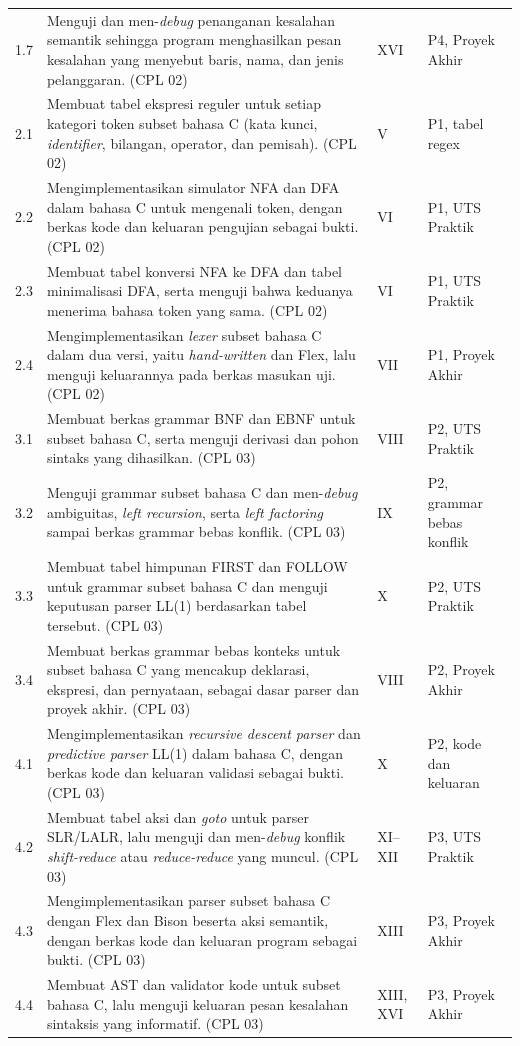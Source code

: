 {\begin{longtable}{@{}p{1.2cm}p{7.0cm}p{1.6cm}p{4.4cm}@{}}
1.7 & Menguji dan men-\textit{debug} penanganan kesalahan semantik
sehingga program menghasilkan pesan kesalahan yang menyebut baris,
nama, dan jenis pelanggaran. (CPL 02) & XVI & P4, Proyek Akhir \\
2.1 & Membuat tabel ekspresi reguler untuk setiap kategori token subset
bahasa C (kata kunci, \textit{identifier}, bilangan, operator, dan
pemisah). (CPL 02) & V & P1, tabel regex \\
2.2 & Mengimplementasikan simulator NFA dan DFA dalam bahasa C untuk
mengenali token, dengan berkas kode dan keluaran pengujian sebagai
bukti. (CPL 02) & VI & P1, UTS Praktik \\
2.3 & Membuat tabel konversi NFA ke DFA dan tabel minimalisasi DFA,
serta menguji bahwa keduanya menerima bahasa token yang sama.
(CPL 02) & VI & P1, UTS Praktik \\
2.4 & Mengimplementasikan \textit{lexer} subset bahasa C dalam dua
versi, yaitu \textit{hand-written} dan Flex, lalu menguji keluarannya
pada berkas masukan uji. (CPL 02) & VII & P1, Proyek Akhir \\
3.1 & Membuat berkas grammar BNF dan EBNF untuk subset bahasa C, serta
menguji derivasi dan pohon sintaks yang dihasilkan. (CPL 03) &
VIII & P2, UTS Praktik \\
3.2 & Menguji grammar subset bahasa C dan men-\textit{debug}
ambiguitas, \textit{left recursion}, serta \textit{left factoring}
sampai berkas grammar bebas konflik. (CPL 03) & IX & P2, grammar bebas
konflik \\
3.3 & Membuat tabel himpunan FIRST dan FOLLOW untuk grammar subset
bahasa C dan menguji keputusan parser LL(1) berdasarkan tabel
tersebut. (CPL 03) & X & P2, UTS Praktik \\
3.4 & Membuat berkas grammar bebas konteks untuk subset bahasa C yang
mencakup deklarasi, ekspresi, dan pernyataan, sebagai dasar parser dan
proyek akhir. (CPL 03) & VIII & P2, Proyek Akhir \\
4.1 & Mengimplementasikan \textit{recursive descent parser} dan
\textit{predictive parser} LL(1) dalam bahasa C, dengan berkas kode
dan keluaran validasi sebagai bukti. (CPL 03) & X & P2, kode dan
keluaran \\
4.2 & Membuat tabel aksi dan \textit{goto} untuk parser SLR/LALR, lalu
menguji dan men-\textit{debug} konflik \textit{shift-reduce} atau
\textit{reduce-reduce} yang muncul. (CPL 03) & XI--XII & P3, UTS
Praktik \\
4.3 & Mengimplementasikan parser subset bahasa C dengan Flex dan Bison
beserta aksi semantik, dengan berkas kode dan keluaran program sebagai
bukti. (CPL 03) & XIII & P3, Proyek Akhir \\
4.4 & Membuat AST dan validator kode untuk subset bahasa C, lalu
menguji keluaran pesan kesalahan sintaksis yang informatif.
(CPL 03) & XIII, XVI & P3, Proyek Akhir \\
\end{longtable}
}

